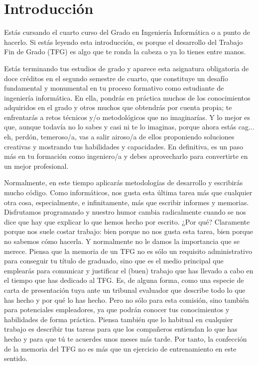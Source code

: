 \chapter{Introducción}
\label{cap:Introducción}

Estás cursando el cuarto curso del Grado en Ingeniería Informática o a punto de hacerlo. Si estás leyendo esta introducción, es porque el desarrollo del Trabajo Fin de Grado (TFG) es algo que te ronda la cabeza o ya lo tienes entre manos.

Estás terminando tus estudios de grado y aparece esta asignatura obligatoria de doce créditos en el segundo semestre de cuarto, que constituye un desafío fundamental y monumental en tu proceso formativo como estudiante de ingeniería informática. En ella, pondrás en práctica muchos de los conocimientos adquiridos en el grado y otros muchos que obtendrás por cuenta propia; te enfrentarás a retos técnicos y/o metodológicos que no imaginarías. Y lo mejor es que, aunque todavía no lo sabes y casi ni te lo imaginas, porque ahora estás cag... eh, perdón, temeroso/a, vas a salir airoso/a de ellos proponiendo soluciones creativas y mostrando tus habilidades y capacidades. En definitiva, es un paso más en tu formación como ingeniero/a y debes aprovecharlo para convertirte en un mejor profesional.

Normalmente, en este tiempo aplicarás metodologías de desarrollo y escribirás mucho código. Como informáticos, nos gusta esta última tarea más que cualquier otra cosa, especialmente, e infinitamente, más que escribir informes y memorias. Disfrutamos programando y nuestro humor cambia radicalmente cuando se nos dice que hay que explicar lo que hemos hecho por escrito. ¿Por qué? Claramente porque nos suele costar trabajo: bien porque no nos gusta esta tarea, bien porque no sabemos cómo hacerla. Y normalmente no le damos la importancia que se merece. Piensa que la memoria de un TFG no es sólo un requisito administrativo para conseguir tu título de graduado, sino que es el medio principal que emplearás para comunicar y justificar el (buen) trabajo que has llevado a cabo en el tiempo que has dedicado al TFG. Es, de alguna forma, como una especie de carta de presentación tuya ante un tribunal evaluador que describe todo lo que has hecho y por qué lo has hecho. Pero no sólo para esta comisión, sino también para potenciales empleadores, ya que podrán conocer tus conocimientos y habilidades de forma práctica. Piensa también que lo habitual en cualquier trabajo es describir tus tareas para que los compañeros entiendan lo que has hecho y para que tú te acuerdes unos meses más tarde. Por tanto, la confección de la memoria del TFG no es más que un ejercicio de entrenamiento en este sentido.

